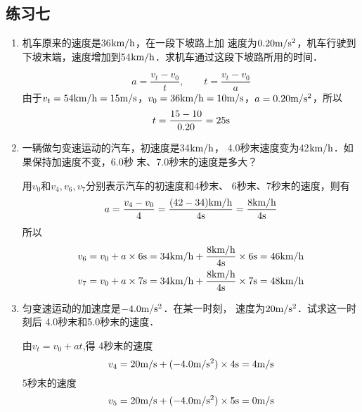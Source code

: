 \subsection{练习七}
\begin{enumerate}
\item 机车原来的速度是36$\text{km}/\text{h}$，在一段下坡路上加
速度为$0.20\text{m}/\text{s}^2$，机车行驶到下坡末端，速度增加到54$\text{km}/\text{h}$．求机车通过这段下坡路所用的时间．   

\begin{solution}
   \[a=\frac{v_t-v_0}{t},\qquad t=\frac{v_t-v_0}{a}\]
   由于$v_t=54\text{km}/\text{h}=15\text{m}/\text{s}$，$v_0=36\text{km}/\text{h}=10\text{m}/\text{s}$，$a=0.20\text{m}/\text{s}^2$，所以
\[t=\frac{15-10}{0.20}=25{\rm s}\]
\end{solution}
\item 一辆做匀变速运动的汽车，初速度是34$\text{km}/\text{h}$，
4.0秒末速度变为42$\text{km}/\text{h}$．如果保持加速度不变，6.0秒
末、7.0秒末的速度是多大？   

\begin{solution}
    用$v_0$和$v_4, v_6,v_7$分别表示汽车的初速度和4秒末、
    6秒末、7秒末的速度，则有
\[a=\frac{v_4-v_0}{4}=\frac{(42-34){\text{km}/\text{h}}}{4{\rm s}}=\frac{8\text{km}/\text{h}}{4{\rm s}}\]
所以
\[\begin{split}
    v_6&=v_0+a\times 6{\rm s}=34\text{km}/\text{h}+\frac{8\text{km}/\text{h}}{4{\rm s}}\times 6{\rm s}=46\text{km}/\text{h}\\
    v_7&=v_0+a\times 7{\rm s}=34\text{km}/\text{h}+\frac{8\text{km}/\text{h}}{4{\rm s}}\times 7{\rm s}=48\text{km}/\text{h}
\end{split}\]
\end{solution}
\item 匀变速运动的加速度是$-4.0\text{m}/\text{s}^2$．在某一时刻，
速度为$20\text{m}/\text{s}^2$．试求这一时刻后 4.0秒末和5.0秒末的速度．   

\begin{solution}
    由$v_t=v_0+at$,得
    4秒末的速度
    \[v_4=20{\rm m/s}+(-4.0\text{m}/\text{s}^2)\times4{\rm s}=4\text{m}/\text{s}\]
    5秒末的速度
    \[v_5=20{\rm m/s}+(-4.0\text{m}/\text{s}^2)\times5{\rm s}=0\text{m}/\text{s}\]
\end{solution}
\end{enumerate}


